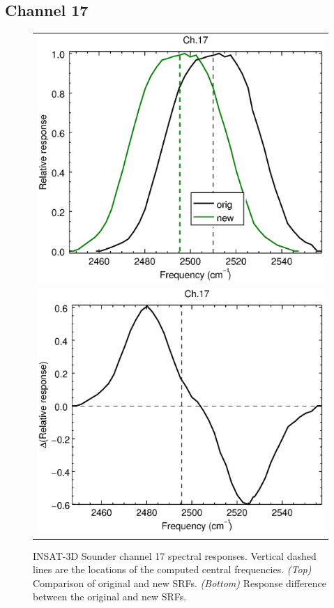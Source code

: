 \subsection{Channel 17}
\begin{figure}[H]
  \centering
  \begin{tabular}{c}
    \includegraphics[scale=0.55]{graphics/sndr/srf/sndr_insat3d-17.eps} \\
    \includegraphics[scale=0.55]{graphics/sndr/srf/sndr_insat3d-17.difference.eps}
  \end{tabular}
  \caption{INSAT-3D Sounder channel 17 spectral responses. Vertical dashed lines are the locations of the computed central frequencies. \emph{(Top)} Comparison of original and new SRFs. \emph{(Bottom)} Response difference between the original and new SRFs.}
  \label{fig:sndr_ch17}
\end{figure}

